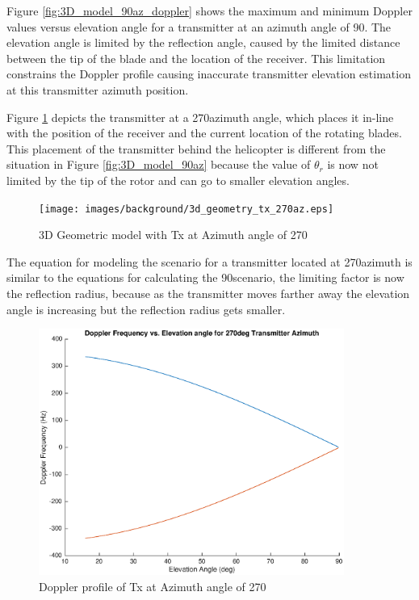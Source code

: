 Figure \ref{fig:3D_model_90az_doppler} shows the maximum and minimum Doppler values versus elevation angle for a transmitter at an azimuth angle of 90\textdegree. The elevation angle is limited by the reflection angle, caused by the limited distance between the tip of the blade and the location of the receiver. This limitation constrains the Doppler profile causing inaccurate transmitter elevation estimation at this transmitter azimuth position.

Figure \ref{fig:3D_model_270az} depicts the transmitter at a 270\textdegree \space azimuth angle, which places it in-line with the position of the receiver and the current location of the rotating blades. This placement of the transmitter behind the helicopter is different from the situation in Figure \ref{fig:3D_model_90az} because the value of $\theta_r$ is now not limited by the tip of the rotor and can go to smaller elevation angles.

\begin{figure}
	\begin{center}
		\texttt{[image: images/background/3d\_geometry\_tx\_270az.eps]}
		\caption{3D Geometric model with Tx at Azimuth angle of 270\textdegree}
		\label{fig:3D_model_270az}
	\end{center}
\end{figure}

The equation for modeling the scenario for a transmitter located at 270\textdegree \space azimuth is similar to the equations for calculating the 90\textdegree \space scenario, the limiting factor is now the reflection radius, because as the transmitter moves farther away the elevation angle is increasing but the reflection radius gets smaller.

\begin{figure}
	\begin{center}
		\includegraphics[width=10cm]{images/background/3d_geometry_tx_270az_doppler_profile.eps}
		\caption{Doppler profile of Tx at Azimuth angle of 270\textdegree}
		\label{fig:3D_model_270az_doppler}
	\end{center}
\end{figure}


